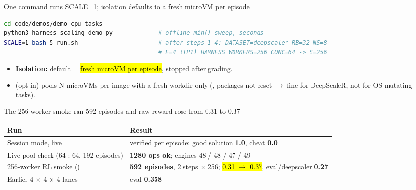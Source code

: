 \begin{frame}[fragile]{One command runs SCALE=1; isolation defaults to a fresh microVM per episode}
\begin{lstlisting}[language=bash,basicstyle=\ttfamily\scriptsize\color{bodytext}]
cd code/demos/demo_cpu_tasks
python3 harness_scaling_demo.py             # offline min() sweep, seconds
SCALE=1 bash 5_run.sh                       # after steps 1-4: DATASET=deepscaler RB=32 NS=8
                                            # E=4 (TP1) HARNESS_WORKERS=256 CONC=64 -> S=256
\end{lstlisting}
\vspace{2mm}
\begin{itemize}\footnotesize\setlength{\itemsep}{1.2mm}
\item \textbf{Isolation:} default = \hl{fresh microVM per episode}, stopped after grading.
\item {} (opt-in) pools N microVMs per image with a fresh  workdir only (, packages not reset $\rightarrow$ fine for DeepScaleR, not for OS-mutating tasks).
\end{itemize}
\end{frame}

\begin{frame}{The 256-worker smoke ran 592 episodes and raw reward rose from 0.31 to 0.37}
\footnotesize\renewcommand{\arraystretch}{1.2}
\begin{tabularx}{\textwidth}{@{}p{} Y@{}}
\toprule
\textbf{Run} & \textbf{Result}\\
\midrule
Session mode, live & verified per episode: good solution \textbf{1.0}, cheat \textbf{0.0}\\
Live pool check (64 : 64, 192 episodes) & \textbf{1280 ops ok}; engines 48 / 48 / 47 / 49\\
256-worker RL smoke () & \textbf{592 episodes}, 2 steps $\times$ 256;  \hl{0.31 $\rightarrow$ 0.37}, eval/deepscaler \textbf{0.27}\\
Earlier 4 $\times$ 4 $\times$ 4 lanes & eval \textbf{0.358}\\
\bottomrule
\end{tabularx}
\par\vspace{4mm}
\end{frame}

